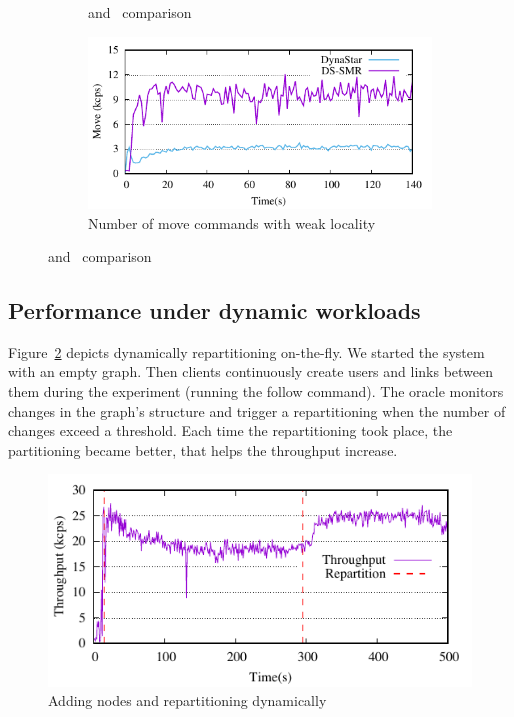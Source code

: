 \begin{figure}[ht]
\begin{subfigure}[b]{0.45\textwidth}
	\caption{\dynastar and \dssmr\ comparison}
  \end{subfigure}
  \begin{subfigure}[b]{0.45\textwidth}
    \centering
    \includegraphics[width=0.95\columnwidth]{figures/experiments/dynastar-vs-dssmr-4p-5-move}
    \caption{Number of move commands with weak locality}
  \end{subfigure}
  \caption{\dynastar and \dssmr\ comparison}
  \label{fig:motivation}
\end{figure}



\subsection{Performance under dynamic workloads}

Figure~\ref{fig:dynamic_load_tput} depicts dynamically repartitioning on-the-fly.
We started the system with an empty graph. Then clients continuously create users and links between them
during the experiment (running the follow command).  The oracle monitors changes in the graph's structure and 
trigger a repartitioning when the number of changes exceed a threshold.
Each time the repartitioning took place, the partitioning became better, that helps the throughput increase. 

\begin{figure}[ht]
	\includegraphics{figures/experiments/dynamicload-tp-move-4p}
	\caption{Adding nodes and repartitioning dynamically}
	\label{fig:dynamic_load_tput}
\end{figure}



